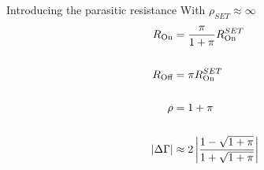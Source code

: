 \documentclass[../main.tex]{subfiles}
\begin{document}
\begin{frame}{Introducing the parasitic resistance}
With \(\rho_{SET} \approx \infty\)
\begin{align*}
    R_{\text{On}}
    &= \frac{\pi}{1 + \pi} R_{\text{On}}^{SET}\\
    \\
    R_{\text{Off}}
    &= \pi R_{\text{On}}^{SET}\\
    \\
    \rho
    &= 1 + \pi\\
    \\
    |\Delta\Gamma| &\approx
                   2\left|
                   \frac{1 - \sqrt{1 + \pi}}{1 + \sqrt{1 + \pi}}
                   \right|\\
\end{align*}
\end{frame}

%
%
%

\end{document}
